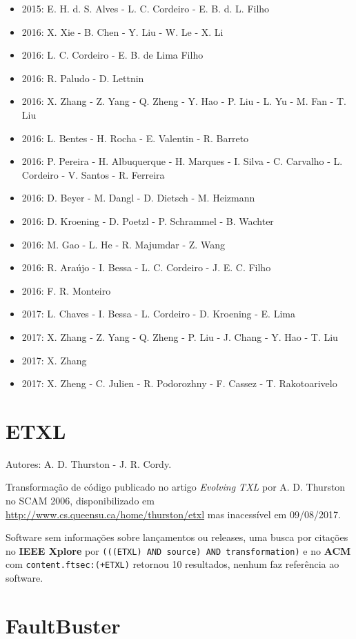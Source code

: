 \begin{itemize}
\item 2015: E. H. d. S. Alves - L. C. Cordeiro - E. B. d. L. Filho
\item 2016: X. Xie - B. Chen - Y. Liu - W. Le - X. Li
\item 2016: L. C. Cordeiro - E. B. de Lima Filho
\item 2016: R. Paludo - D. Lettnin
\item 2016: X. Zhang - Z. Yang - Q. Zheng - Y. Hao - P. Liu - L. Yu - M. Fan - T. Liu
\item 2016: L. Bentes - H. Rocha - E. Valentin - R. Barreto
\item 2016: P. Pereira - H. Albuquerque - H. Marques - I. Silva - C. Carvalho - L. Cordeiro - V. Santos - R. Ferreira
\item 2016: D. Beyer - M. Dangl - D. Dietsch - M. Heizmann
\item 2016: D. Kroening - D. Poetzl - P. Schrammel - B. Wachter
\item 2016: M. Gao - L. He - R. Majumdar - Z. Wang
\item 2016: R. Araújo - I. Bessa - L. C. Cordeiro - J. E. C. Filho
\item 2016: F. R. Monteiro
\item 2017: L. Chaves - I. Bessa - L. Cordeiro - D. Kroening - E. Lima
\item 2017: X. Zhang - Z. Yang - Q. Zheng - P. Liu - J. Chang - Y. Hao - T. Liu
\item 2017: X. Zhang
\item 2017: X. Zheng - C. Julien - R. Podorozhny - F. Cassez - T. Rakotoarivelo
\end{itemize}

\section{ETXL}

Autores:
A. D. Thurston - J. R. Cordy.

Transformação de código
publicado no artigo {\it Evolving TXL}
por A. D. Thurston
no SCAM 2006,
disponibilizado em \url{http://www.cs.queensu.ca/home/thurston/etxl}
mas inacessível em 09/08/2017.

Software sem informações sobre lançamentos ou releases,
uma busca por citações no {\bf IEEE Xplore} por
\texttt{(((ETXL) AND source) AND transformation)}
e no {\bf ACM} com
\texttt{content.ftsec:(+ETXL)}
retornou
10 resultados,
nenhum faz referência ao software.


\section{FaultBuster}

